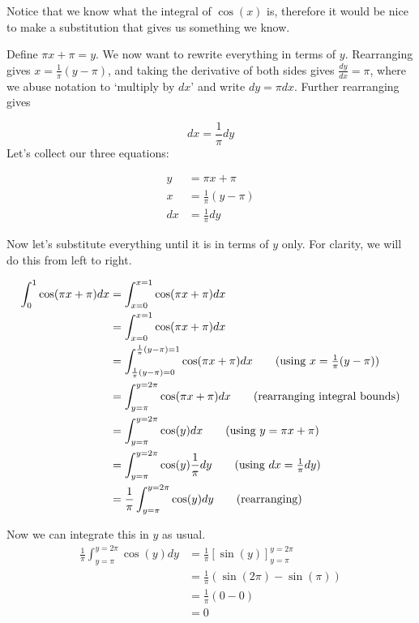 \begin{solution}
    Notice that we know what the integral of $\cos(x)$ is, therefore it would be nice to make a substitution that gives us something we know.

    Define $\pi x + \pi= y$. We now want to rewrite everything in terms of $y$. Rearranging gives $x = \frac{1}{\pi}(y - \pi)$, and taking the derivative of both sides gives
    $\frac{dy}{dx} = \pi$, where we abuse notation to `multiply by $dx$' and write $dy = \pi dx$. Further rearranging gives 

    \[ dx = \frac{1}{\pi}dy\] 
    Let's collect our three equations:

    \begin{align*}
        y &= \pi x + \pi \\
        x &= \frac{1}{\pi}(y - \pi) \\
        dx &= \frac{1}{\pi}dy
    \end{align*}

    Now let's substitute everything until it is in terms of $y$ only. For clarity, we will do this from left to right.

    \begin{align*}
        \int_{0}^{1} \cos(\pi x + \pi) dx  &= \int_{x=0}^{x=1} \cos(\pi x + \pi) dx \\
         &= \int_{x=0}^{x=1} \cos(\pi x + \pi) dx \\
         &= \int_{\frac{1}{\pi}(y - \pi)=0}^{\frac{1}{\pi}(y - \pi)=1} \cos(\pi x + \pi) dx \tag{using $x = \frac{1}{\pi}(y - \pi) $} \\
         &= \int_{y=\pi}^{y=2\pi} \cos(\pi x + \pi)  dx \tag{rearranging integral bounds} \\
         &= \int_{y=\pi}^{y=2\pi} \cos(y) dx \tag{using $y = \pi x + \pi $} \\
         &= \int_{y=\pi}^{y=2\pi}\cos(y) \frac{1}{\pi}dy \tag{using $dx =  \frac{1}{\pi}dy$} \\
         &= \frac{1}{\pi}\int_{y=\pi}^{y=2\pi}\cos(y) dy \tag{rearranging} \\
    \end{align*}

    Now we can integrate this in $y$ as usual.
    \begin{align*}
         \frac{1}{\pi}\int_{y=\pi}^{y=2\pi}\cos(y) dy &= \frac{1}{\pi} \left[ \sin(y) \right]_{y=\pi}^{y=2\pi} \\
         &=  \frac{1}{\pi} \left(  \sin(2\pi)  - \sin(\pi)  \right) \\
         &=  \frac{1}{\pi} \left(  0 - 0  \right) \\
         &= 0
    \end{align*}


\end{solution}
